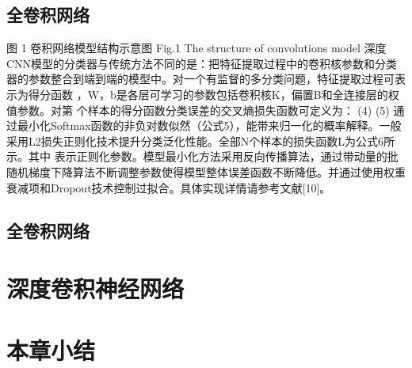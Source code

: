 \subsection{全卷积网络} 
图 1 卷积网络模型结构示意图
Fig.1 The structure of convolutions model
深度CNN模型的分类器与传统方法不同的是：把特征提取过程中的卷积核参数和分类器的参数整合到端到端的模型中。对一个有监督的多分类问题，特征提取过程可表示为得分函数 ，W，b是各层可学习的参数包括卷积核K，偏置B和全连接层的权值参数。对第 个样本的得分函数分类误差的交叉熵损失函数可定义为：
  	 (4)
     (5)
通过最小化Softmax函数的非负对数似然（公式5），能带来归一化的概率解释。一般采用L2损失正则化技术提升分类泛化性能。全部N个样本的损失函数L为公式6所示。其中  表示正则化参数。模型最小化方法采用反向传播算法，通过带动量的批随机梯度下降算法不断调整参数使得模型整体误差函数不断降低。并通过使用权重衰减项和Dropout技术控制过拟合。具体实现详情请参考文献[10]。

\subsection{全卷积网络}
 
\section{深度卷积神经网络}
\section{本章小结}


